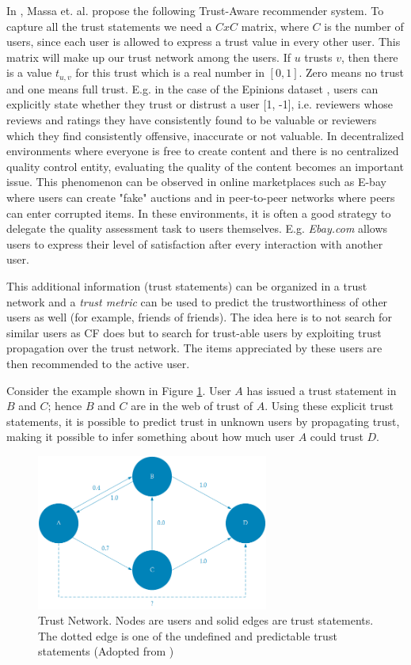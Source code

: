 In \cite{Massa2004}, Massa et. al. propose the following Trust-Aware recommender system.
To capture all the trust statements we need a $CxC$ matrix, where $C$ is the number of users, since each user is allowed to express a trust value in every other user. This matrix will make up our trust network among the users. If $u$
trusts $v$, then there is a value $t_{u,v}$ for this trust which is a real
number in $[0,1]$. Zero means no trust and one means full trust. E.g. in the case of the Epinions dataset \cite{Epinions}, users can explicitly state whether they trust or distrust a user [1, -1], i.e. reviewers whose reviews and ratings they have consistently found to be valuable or reviewers which they find consistently offensive, inaccurate or not valuable. In decentralized environments where everyone is free to create content and there
is no centralized quality control entity, evaluating the quality of the content becomes an important issue. This phenomenon can be observed in online
marketplaces such as E-bay where users can create "fake" auctions and in peer-to-peer networks where peers can enter corrupted items. In these environments, it is often a good strategy to delegate the quality assessment task to users themselves. E.g. \emph{Ebay.com} allows users to express their level of satisfaction after every interaction with another user.

This additional information (trust statements) can be organized in a trust network and a \emph{trust metric} can be used to predict the
trustworthiness of other users as well (for example, friends of friends). The idea here is to not search for similar users as CF does but to search for
trust-able users by exploiting trust propagation over the trust network. The items appreciated by these users are then recommended to the active user. 

Consider the example shown in Figure \ref{figure:weboftrust}. User $A$ has issued a trust statement in $B$ and $C$; hence
$B$ and $C$ are in the web of trust of $A$. Using these explicit trust statements, it
is possible to predict trust in unknown users by propagating trust, making it
possible to infer something about how much user $A$ could trust $D$.

\begin{figure}[H]
    \includegraphics[width=3in]{image/webofTrust.png}
    \centering
    \caption[Trust Network]{Trust Network. Nodes are users and solid edges are trust statements. The dotted edge is one of the undefined and predictable trust statements (Adopted from \cite{Massa2004})}
    \label{figure:weboftrust}
\end{figure}

